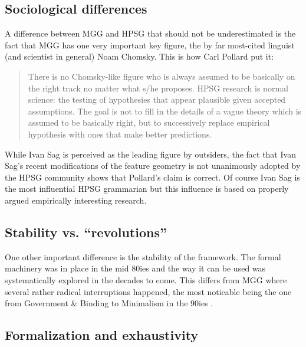 \documentclass[output=paper]{langsci/langscibook}
\begin{document}

\subsection{Sociological differences}

A difference between MGG and HPSG that should not be underestimated is the fact that MGG has one
very important key figure, the by far most-cited linguist (and scientist in general) Noam
Chomsky. This is how Carl Pollard put it:
\begin{quote}
There is no Chomsky-like figure who is always assumed to be basically on the right track no matter
what s/he proposes. HPSG research is normal science: the testing of hypothesies that appear
plausible given accepted assumptions. The goal is not to fill in the details of a vague theory which
is assumed to be basically right, but to successively replace empirical hypothesis with ones that
make better predictions. \citep[Section~1.2.1]{Pollard1997a}
\end{quote}
While Ivan Sag is perceived as the leading figure by outsiders, the fact that Ivan Sag's recent
modifications of the feature geometry \citep{Sag2012a} is not unanimously adopted by the HPSG community shows that Pollard's
claim is correct. Of course Ivan Sag is the most influential HPSG grammarian but this influence is
based on properly argued empirically interesting research.

\subsection{Stability vs. ``revolutions''}

One other important difference is the stability of the framework. The formal machinery was in place
in the mid 80ies and the way it can be used was systematically explored in the decades to
come. This differs from MGG where several rather radical interruptions happened, the most noticable
being the one from Government \& Binding to Minimalism in the 90ies \citep*{LLJ2000a}.

\subsection{Formalization and exhaustivity}
\end{document}

